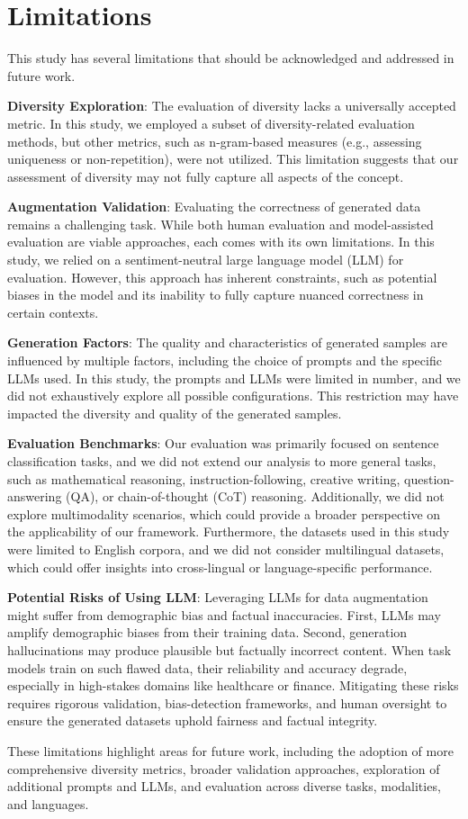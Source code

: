 \section{Limitations}
This study has several limitations that should be acknowledged and addressed in future work.

\noindent\textbf{Diversity Exploration}: The evaluation of diversity lacks a universally accepted metric. 
In this study, we employed a subset of diversity-related evaluation methods, but other metrics, such as n-gram-based measures (e.g., assessing uniqueness or non-repetition), were not utilized. 
This limitation suggests that our assessment of diversity may not fully capture all aspects of the concept.

\noindent\textbf{Augmentation Validation}: Evaluating the correctness of generated data remains a challenging task. 
While both human evaluation and model-assisted evaluation are viable approaches, each comes with its own limitations. 
In this study, we relied on a sentiment-neutral large language model (LLM) for evaluation. 
However, this approach has inherent constraints, such as potential biases in the model and its inability to fully capture nuanced correctness in certain contexts.

\noindent\textbf{Generation Factors}: The quality and characteristics of generated samples are influenced by multiple factors, including the choice of prompts and the specific LLMs used. 
In this study, the prompts and LLMs were limited in number, and we did not exhaustively explore all possible configurations. 
This restriction may have impacted the diversity and quality of the generated samples.

\noindent\textbf{Evaluation Benchmarks}: Our evaluation was primarily focused on sentence classification tasks, and we did not extend our analysis to more general tasks, such as mathematical reasoning, instruction-following, creative writing, question-answering (QA), or chain-of-thought (CoT) reasoning. 
Additionally, we did not explore multimodality scenarios, which could provide a broader perspective on the applicability of our framework. 
Furthermore, the datasets used in this study were limited to English corpora, and we did not consider multilingual datasets, which could offer insights into cross-lingual or language-specific performance. 

\noindent\textbf{Potential Risks of Using LLM}: Leveraging LLMs for data augmentation might suffer from demographic bias and factual inaccuracies. First, LLMs may amplify demographic biases from their training data. Second, generation hallucinations may produce plausible but factually incorrect content. When task models train on such flawed data, their reliability and accuracy degrade, especially in high-stakes domains like healthcare or finance. Mitigating these risks requires rigorous validation, bias-detection frameworks, and human oversight to ensure the generated datasets uphold fairness and factual integrity.

These limitations highlight areas for future work, including the adoption of more comprehensive diversity metrics, broader validation approaches, exploration of additional prompts and LLMs, and evaluation across diverse tasks, modalities, and languages. 

